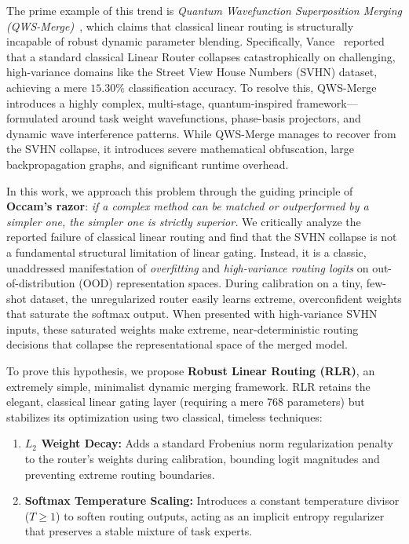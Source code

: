 The prime example of this trend is \emph{Quantum Wavefunction Superposition Merging (QWS-Merge)}~\cite{vance2025quantum}, which claims that classical linear routing is structurally incapable of robust dynamic parameter blending. Specifically, Vance~\cite{vance2025quantum} reported that a standard classical Linear Router collapses catastrophically on challenging, high-variance domains like the Street View House Numbers (SVHN) dataset, achieving a mere $15.30\%$ classification accuracy. To resolve this, QWS-Merge introduces a highly complex, multi-stage, quantum-inspired framework—formulated around task weight wavefunctions, phase-basis projectors, and dynamic wave interference patterns. While QWS-Merge manages to recover from the SVHN collapse, it introduces severe mathematical obfuscation, large backpropagation graphs, and significant runtime overhead.

In this work, we approach this problem through the guiding principle of \textbf{Occam's razor}: \emph{if a complex method can be matched or outperformed by a simpler one, the simpler one is strictly superior.} We critically analyze the reported failure of classical linear routing and find that the SVHN collapse is not a fundamental structural limitation of linear gating. Instead, it is a classic, unaddressed manifestation of \emph{overfitting} and \emph{high-variance routing logits} on out-of-distribution (OOD) representation spaces. During calibration on a tiny, few-shot dataset, the unregularized router easily learns extreme, overconfident weights that saturate the softmax output. When presented with high-variance SVHN inputs, these saturated weights make extreme, near-deterministic routing decisions that collapse the representational space of the merged model.

To prove this hypothesis, we propose \textbf{Robust Linear Routing (RLR)}, an extremely simple, minimalist dynamic merging framework. RLR retains the elegant, classical linear gating layer (requiring a mere 768 parameters) but stabilizes its optimization using two classical, timeless techniques:
\begin{enumerate}
    \item \textbf{$L_2$ Weight Decay:} Adds a standard Frobenius norm regularization penalty to the router's weights during calibration, bounding logit magnitudes and preventing extreme routing boundaries.
    \item \textbf{Softmax Temperature Scaling:} Introduces a constant temperature divisor ($T \ge 1$) to soften routing outputs, acting as an implicit entropy regularizer that preserves a stable mixture of task experts.
\end{enumerate}

